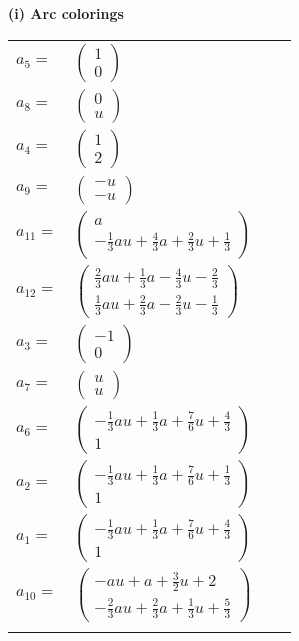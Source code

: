 \documentclass[1p]{elsarticle_modified}
\theoremstyle{definition}
\begin{document}
\flushleft \textbf{(i) Arc colorings}\\
\begin{tabular}{m{7pt} m{180pt} m{7pt} m{180pt} }
\flushright $a_{5}=$&$\begin{pmatrix}1\\0\end{pmatrix}$ \\
\flushright $a_{8}=$&$\begin{pmatrix}0\\u\end{pmatrix}$ \\
\flushright $a_{4}=$&$\begin{pmatrix}1\\2\end{pmatrix}$ \\
\flushright $a_{9}=$&$\begin{pmatrix}- u\\- u\end{pmatrix}$ \\
\flushright $a_{11}=$&$\begin{pmatrix}a\\-\frac{1}{3} a u+\frac{4}{3} a+\frac{2}{3} u+\frac{1}{3}\end{pmatrix}$ \\
\flushright $a_{12}=$&$\begin{pmatrix}\frac{2}{3} a u+\frac{1}{3} a-\frac{4}{3} u-\frac{2}{3}\\\frac{1}{3} a u+\frac{2}{3} a-\frac{2}{3} u-\frac{1}{3}\end{pmatrix}$ \\
\flushright $a_{3}=$&$\begin{pmatrix}-1\\0\end{pmatrix}$ \\
\flushright $a_{7}=$&$\begin{pmatrix}u\\u\end{pmatrix}$ \\
\flushright $a_{6}=$&$\begin{pmatrix}-\frac{1}{3} a u+\frac{1}{3} a+\frac{7}{6} u+\frac{4}{3}\\1\end{pmatrix}$ \\
\flushright $a_{2}=$&$\begin{pmatrix}-\frac{1}{3} a u+\frac{1}{3} a+\frac{7}{6} u+\frac{1}{3}\\1\end{pmatrix}$ \\
\flushright $a_{1}=$&$\begin{pmatrix}-\frac{1}{3} a u+\frac{1}{3} a+\frac{7}{6} u+\frac{4}{3}\\1\end{pmatrix}$ \\
\flushright $a_{10}=$&$\begin{pmatrix}- a u+a+\frac{3}{2} u+2\\-\frac{2}{3} a u+\frac{2}{3} a+\frac{1}{3} u+\frac{5}{3}\end{pmatrix}$\\&\end{tabular}
\end{document}
